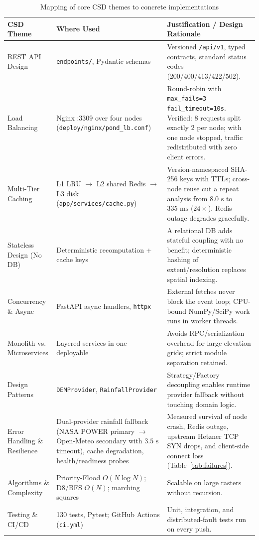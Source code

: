 \documentclass[manuscript,screen,review]{acmart}
\begin{document}
\begin{table}[t]
  \caption{Mapping of core CSD themes to concrete implementations}
  \label{tab:csd-themes}
  \begin{tabular}{p{3.0cm}p{4.8cm}p{7.4cm}}
    \toprule
    CSD Theme & Where Used & Justification / Design Rationale \\
    \midrule
    REST API Design & \texttt{endpoints/}, Pydantic schemas & Versioned \texttt{/api/v1}, typed contracts, standard status codes (200/400/413/422/502). \\
    Load Balancing & Nginx :3309 over four nodes (\texttt{deploy/nginx/pond\_lb.conf}) & Round-robin with \texttt{max\_fails=3 fail\_timeout=10s}. Verified: 8 requests split exactly 2 per node; with one node stopped, traffic redistributed with zero client errors. \\
    Multi-Tier Caching & L1 LRU $\to$ L2 shared Redis $\to$ L3 disk (\texttt{app/services/cache.py}) & Version-namespaced SHA-256 keys with TTLs; cross-node reuse cut a repeat analysis from $8.0\text{ s}$ to $335\text{ ms}$ ($24\times$). Redis outage degrades gracefully. \\
    Stateless Design (No DB) & Deterministic recomputation + cache keys & A relational DB adds stateful coupling with no benefit; deterministic hashing of extent/resolution replaces spatial indexing. \\
    Concurrency \& Async & FastAPI async handlers, \texttt{httpx} & External fetches never block the event loop; CPU-bound NumPy/SciPy work runs in worker threads. \\
    Monolith vs. Microservices & Layered services in one deployable & Avoids RPC/serialization overhead for large elevation grids; strict module separation retained. \\
    Design Patterns & \texttt{DEMProvider}, \texttt{RainfallProvider} & Strategy/Factory decoupling enables runtime provider fallback without touching domain logic. \\
    Error Handling \& Resilience & Dual-provider rainfall fallback (NASA POWER primary $\to$ Open-Meteo secondary with $3.5\text{ s}$ timeout), cache degradation, health/readiness probes & Measured survival of node crash, Redis outage, upstream Hetzner TCP SYN drops, and client-side connect loss (Table~\ref{tab:failures}). \\
    Algorithms \& Complexity & Priority-Flood $O(N \log N)$; D8/BFS $O(N)$; marching squares & Scalable on large rasters without recursion. \\
    Testing \& CI/CD & 130 tests, Pytest; GitHub Actions (\texttt{ci.yml}) & Unit, integration, and distributed-fault tests run on every push. \\
    \bottomrule
  \end{tabular}
\end{table}
\end{document}

